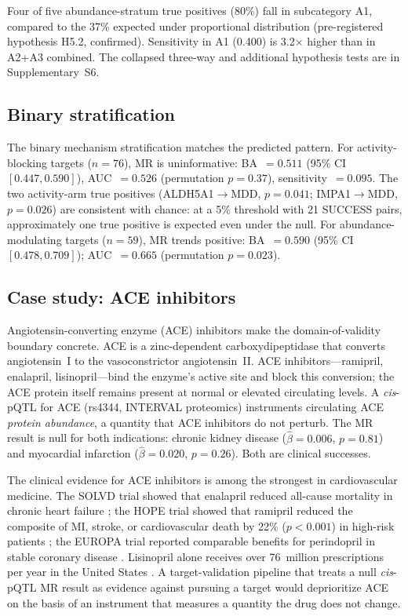 \documentclass[11pt]{article}
\begin{document}
Four of five abundance-stratum true positives (80\%) fall in subcategory A1, compared to the 37\% expected under proportional distribution (pre-registered hypothesis H5.2, confirmed). Sensitivity in A1 (0.400) is 3.2$\times$ higher than in A2+A3 combined. The collapsed three-way and additional hypothesis tests are in Supplementary~S6.

\subsection{Binary stratification}
\label{sec:binary}

The binary mechanism stratification matches the predicted pattern. For activity-blocking targets ($n = 76$), MR is uninformative: BA~$= 0.511$ (95\% CI $[0.447, 0.590]$), AUC~$= 0.526$ (permutation $p = 0.37$), sensitivity~$= 0.095$. The two activity-arm true positives (ALDH5A1$\rightarrow$MDD, $p = 0.041$; IMPA1$\rightarrow$MDD, $p = 0.026$) are consistent with chance: at a 5\% threshold with 21 SUCCESS pairs, approximately one true positive is expected even under the null. For abundance-modulating targets ($n = 59$), MR trends positive: BA~$= 0.590$ (95\% CI $[0.478, 0.709]$); AUC~$= 0.665$ (permutation $p = 0.023$).

\subsection{Case study: ACE inhibitors}
\label{sec:ace}

Angiotensin-converting enzyme (ACE) inhibitors make the domain-of-validity boundary concrete. ACE is a zinc-dependent carboxydipeptidase that converts angiotensin~I to the vasoconstrictor angiotensin~II. ACE inhibitors---ramipril, enalapril, lisinopril---bind the enzyme's active site and block this conversion; the ACE protein itself remains present at normal or elevated circulating levels. A \emph{cis}-pQTL for ACE (rs4344, INTERVAL proteomics) instruments circulating ACE \emph{protein abundance}, a quantity that ACE inhibitors do not perturb. The MR result is null for both indications: chronic kidney disease ($\hat{\beta} = 0.006$, $p = 0.81$) and myocardial infarction ($\hat{\beta} = 0.020$, $p = 0.26$). Both are clinical successes.

The clinical evidence for ACE inhibitors is among the strongest in cardiovascular medicine. The SOLVD trial showed that enalapril reduced all-cause mortality in chronic heart failure \cite{solvd1991}; the HOPE trial showed that ramipril reduced the composite of MI, stroke, or cardiovascular death by 22\% ($p < 0.001$) in high-risk patients \cite{hope2000}; the EUROPA trial reported comparable benefits for perindopril in stable coronary disease \cite{europa2003}. Lisinopril alone receives over 76~million prescriptions per year in the United States \cite{clincalc2023}. A target-validation pipeline that treats a null \emph{cis}-pQTL MR result as evidence against pursuing a target would deprioritize ACE on the basis of an instrument that measures a quantity the drug does not change.
\end{document}
